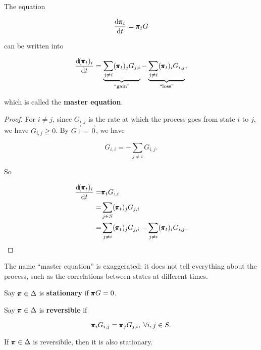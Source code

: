 \begin{theorem}
    The equation 

    \begin{equation*}
        \frac{\dif \mbf{\pi}_t}{\dif t} = \mbf{\pi}_t G
    \end{equation*}
    
    can be written into

    \begin{equation*}
        \frac{\dif (\mbf{\pi}_t)_i}{\dif t} = \underbrace{\sum_{j \neq i} (\mbf{\pi}_t)_j G_{j, i}}_{\text{``gain''}}  - \underbrace{\sum_{j \neq i} (\mbf{\pi}_t)_i G_{i, j}}_{\text{``loss''}},
    \end{equation*}

    which is called the \textbf{master equation}.

    \begin{proof}
        For $i \neq j$, since $G_{i,j}$ is the rate at which the process goes from state $i$ to $j$, we have $G_{i,j} \ge 0$. By $G \vec{1} = \vec{0}$, we have 
    
        \begin{equation*}
            G_{i, i} = - \sum_{j \neq i} G_{i, j}.
        \end{equation*}
    
        So 
    
        \begin{align*}
            \frac{\dif (\mbf{\pi}_t)_i}{\dif t} = & \mbf{\pi}_t G_{:, i} \\ 
            = & \sum_{j \in S} (\mbf{\pi}_t)_j G_{j, i} \\ 
            = & \sum_{j \neq i} (\mbf{\pi}_t)_j G_{j, i} - \sum_{j \neq i} (\mbf{\pi}_t)_i G_{i, j}.
        \end{align*}
    \end{proof}
\end{theorem}

\begin{remark}
    The name ``master equation'' is exaggerated; it does not tell everything about the process, such as the correlations between states at different times.
\end{remark}

\begin{definition}[Stationarity]
    Say $\pmb{\pi} \in \Delta$ is \textbf{stationary} if $\pmb{\pi} G = 0$.
\end{definition}

\begin{definition}[Reversibility]
    Say $\pmb{\pi} \in \Delta$ is \textbf{reversible} if 

    \begin{equation*}
        \pmb{\pi}_i G_{i,j} = \pmb{\pi}_j G_{j, i}, \; \forall i,j \in S.
    \end{equation*}
\end{definition}

\begin{prop}
    If $\pmb{\pi} \in \Delta$ is reversibile, then it is also stationary.
\end{prop}

\begin{prop}
    
\end{prop}